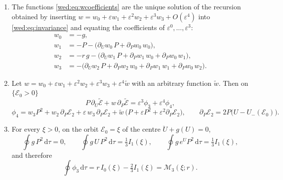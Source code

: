 \begin{lemma}\label{wed:lem:normalform}
\begin{enumerate}[label=\textup{(\roman*)}]
\item The functions \eqref{wed:eq:wcoefficients} are the unique solution of the recursion obtained by inserting $w=w_0+\varepsilon w_1+\varepsilon^2w_2+\varepsilon^3w_3+O(\varepsilon^4)$ into \eqref{wed:eq:invariance} and equating the coefficients of $\varepsilon^0,\dots,\varepsilon^3$:
\begin{equation}\label{wed:eq:recursion}
\begin{aligned}
w_0&=-g,\\
w_1&=-P-\bigl(\partial_Uw_0\,P+\partial_Pw_0\,w_0\bigr),\\
w_2&=-r\,g-\bigl(\partial_Uw_1\,P+\partial_Pw_1\,w_0+\partial_Pw_0\,w_1\bigr),\\
w_3&=-\bigl(\partial_Uw_2\,P+\partial_Pw_2\,w_0+\partial_Pw_1\,w_1+\partial_Pw_0\,w_2\bigr).
\end{aligned}
\end{equation}
\item Let $w=w_0+\varepsilon w_1+\varepsilon^2w_2+\varepsilon^3w_3+\varepsilon^4\tilde w$ with an arbitrary function $\tilde w$. Then on $\{\mathcal E_0>0\}$
\begin{equation}\label{wed:eq:drift}
P\,\partial_U\tilde{\mathcal E}+w\,\partial_P\tilde{\mathcal E}=\varepsilon^3\phi_3+\varepsilon^4\phi_4,
\end{equation}
\begin{equation}\label{wed:eq:phi4}
\phi_4=w_3P^2+w_2\,\partial_P\mathcal E_2+\varepsilon\,w_3\,\partial_P\mathcal E_2+\tilde w\,\bigl(P+\varepsilon P^2+\varepsilon^2\partial_P\mathcal E_2\bigr),
\qquad \partial_P\mathcal E_2=2P\bigl(U-U_-(\mathcal E_0)\bigr).
\end{equation}
\item For every $\xi>0$, on the orbit $\mathcal E_0=\xi$ of the centre $\ddot U+g(U)=0$,
\begin{equation}\label{wed:eq:todaaverages}
\oint g\,P^2\,\mathrm d\tau=0,\qquad
\oint g\,U\,P^2\,\mathrm d\tau=\tfrac13I_1(\xi),\qquad
\oint g\,e^UP^2\,\mathrm d\tau=\tfrac13I_1(\xi),
\end{equation}
and therefore
\begin{equation}\label{wed:eq:thirdaverage}
\oint\phi_3\,\mathrm d\tau=r\,I_0(\xi)-\tfrac23I_1(\xi)=\mathcal M_3(\xi;r).
\end{equation}
\end{enumerate}
\end{lemma}
